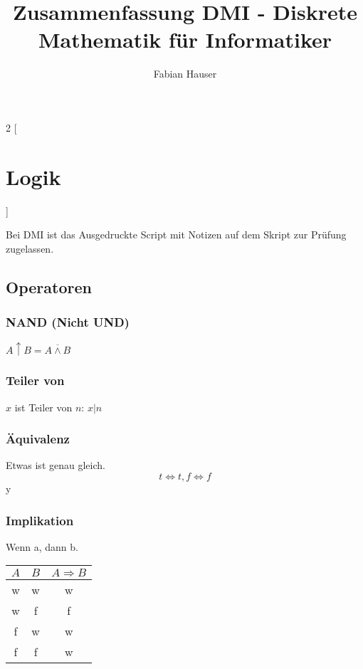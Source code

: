 

\title{Zusammenfassung DMI - Diskrete Mathematik für Informatiker}
\author{Fabian Hauser}
 

\maketitle
\begin{multicols}{2}
[
\section{Logik}
]

	Bei DMI ist das Ausgedruckte Script mit Notizen auf dem Skript zur Prüfung zugelassen.

\subsection{Operatoren}


\subsubsection{NAND (Nicht UND)}

$A \uparrow B = \overline{A \land B}$

\subsubsection{Teiler von}
	$x$ ist Teiler von $n$: $x|n$

\subsubsection{Äquivalenz}
	Etwas ist genau gleich.
	\[
	t \Leftrightarrow t, f \Leftrightarrow f
	\]y

\subsubsection{Implikation}
	Wenn a, dann b.
	
	\begin{tabular}{| c | c | c |}
	\hline 
	$A$ & $B$ & $A \Rightarrow B$ \\
	\hline
	w & w & w \\
	w & f & f \\
	f & w & w \\
	f & f & w \\
	\hline
	\end{tabular}




\end{multicols}
